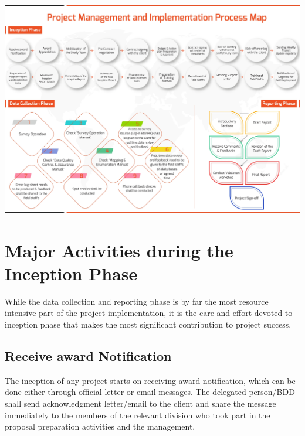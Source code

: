 \documentclass[
]{book}
\theoremstyle{definition}
\theoremstyle{definition}
\theoremstyle{definition}
\theoremstyle{definition}
\theoremstyle{remark}
\begin{document}
\includegraphics{project.jpg}

\hypertarget{major-activities-during-the-inception-phase}{%
\section{Major Activities during the Inception Phase}\label{major-activities-during-the-inception-phase}}

While the data collection and reporting phase is by far the most resource intensive part of the project implementation, it is the care and effort devoted to inception phase that makes the most significant contribution to project success.

\hypertarget{receive-award-notification}{%
\subsection{Receive award Notification}\label{receive-award-notification}}

The inception of any project starts on receiving award notification, which can be done either through official letter or email messages. The delegated person/BDD shall send acknowledgment letter/email to the client and share the message immediately to the members of the relevant division who took part in the proposal preparation activities and the management.
\end{document}
